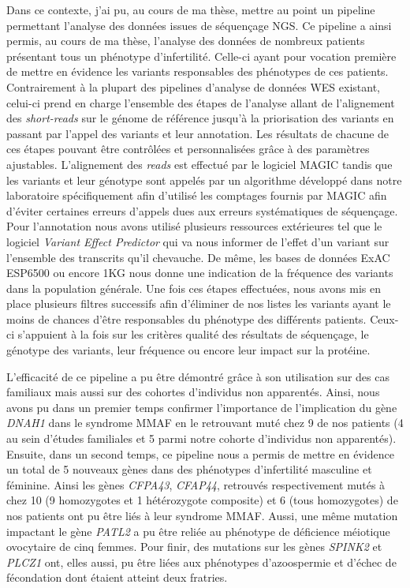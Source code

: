 \documentclass[12pt,a4paper,twoside]{ugathesis}
\theoremstyle{definition}
\theoremstyle{definition}
\theoremstyle{definition}
\theoremstyle{remark}
\begin{document}
Dans ce contexte, j'ai pu, au cours de ma thèse, mettre au point un
pipeline permettant l'analyse des données issues de séquençage NGS. Ce
pipeline a ainsi permis, au cours de ma thèse, l'analyse des données de
nombreux patients présentant tous un phénotype d'infertilité. Celle-ci
ayant pour vocation première de mettre en évidence les variants
responsables des phénotypes de ces patients. Contrairement à la plupart
des pipelines d'analyse de données WES existant, celui-ci prend en
charge l'ensemble des étapes de l'analyse allant de l'alignement des
\emph{short-reads} sur le génome de référence jusqu'à la priorisation
des variants en passant par l'appel des variants et leur annotation. Les
résultats de chacune de ces étapes pouvant être contrôlées et
personnalisées grâce à des paramètres ajustables. L'alignement des
\emph{reads} est effectué par le logiciel MAGIC tandis que les variants
et leur génotype sont appelés par un algorithme développé dans notre
laboratoire spécifiquement afin d'utilisé les comptages fournis par
MAGIC afin d'éviter certaines erreurs d'appels dues aux erreurs
systématiques de séquençage. Pour l'annotation nous avons utilisé
plusieurs ressources extérieures tel que le logiciel \emph{Variant
Effect Predictor} qui va nous informer de l'effet d'un variant sur
l'ensemble des transcrits qu'il chevauche. De même, les bases de données
ExAC ESP6500 ou encore 1KG nous donne une indication de la fréquence des
variants dans la population générale. Une fois ces étapes effectuées,
nous avons mis en place plusieurs filtres successifs afin d'éliminer de
nos listes les variants ayant le moins de chances d'être responsables du
phénotype des différents patients. Ceux-ci s'appuient à la fois sur les
critères qualité des résultats de séquençage, le génotype des variants,
leur fréquence ou encore leur impact sur la protéine.

L'efficacité de ce pipeline a pu être démontré grâce à son utilisation
sur des cas familiaux mais aussi sur des cohortes d'individus non
apparentés. Ainsi, nous avons pu dans un premier temps confirmer
l'importance de l'implication du gène \emph{DNAH1} dans le syndrome MMAF
en le retrouvant muté chez 9 de nos patients (4 au sein d'études
familiales et 5 parmi notre cohorte d'individus non apparentés).
Ensuite, dans un second temps, ce pipeline nous a permis de mettre en
évidence un total de 5 nouveaux gènes dans des phénotypes d'infertilité
masculine et féminine. Ainsi les gènes \emph{CFPA43}, \emph{CFAP44},
retrouvés respectivement mutés à chez 10 (9 homozygotes et 1
hétérozygote composite) et 6 (tous homozygotes) de nos patients ont pu
être liés à leur syndrome MMAF. Aussi, une même mutation impactant le
gène \emph{PATL2} a pu être reliée au phénotype de déficience méiotique
ovocytaire de cinq femmes. Pour finir, des mutations sur les gènes
\emph{SPINK2} et \emph{PLCZ1} ont, elles aussi, pu être liées aux
phénotypes d'azoospermie et d'échec de fécondation dont étaient atteint
deux fratries.
\end{document}
